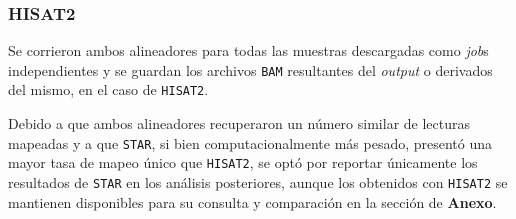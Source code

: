 \documentclass[
  12pt,
  letterpaper,
  DIV=11,
  numbers=noendperiod]{scrartcl}
\newenvironment{Shaded}{\begin{snugshade}}{\end{snugshade}}
\newcommand{\AttributeTok}[1]{\textcolor[rgb]{0.40,0.45,0.13}{#1}}
\newcommand{\CommentTok}[1]{\textcolor[rgb]{0.37,0.37,0.37}{#1}}
\newcommand{\DataTypeTok}[1]{\textcolor[rgb]{0.68,0.00,0.00}{#1}}
\newcommand{\DecValTok}[1]{\textcolor[rgb]{0.68,0.00,0.00}{#1}}
\newcommand{\ExtensionTok}[1]{\textcolor[rgb]{0.00,0.23,0.31}{#1}}
\newcommand{\NormalTok}[1]{\textcolor[rgb]{0.00,0.23,0.31}{#1}}
\newcommand{\OperatorTok}[1]{\textcolor[rgb]{0.37,0.37,0.37}{#1}}
\newcommand{\StringTok}[1]{\textcolor[rgb]{0.13,0.47,0.30}{#1}}
\newcommand{\VariableTok}[1]{\textcolor[rgb]{0.07,0.07,0.07}{#1}}
\begin{document}
\begin{Shaded}
\end{Shaded}

\subsubsection{HISAT2}\label{hisat2}

Se corrieron ambos alineadores para todas las muestras descargadas como
\emph{job}s independientes y se guardan los archivos \texttt{BAM}
resultantes del \emph{output} o derivados del mismo, en el caso de
\texttt{HISAT2}.

Debido a que ambos alineadores recuperaron un número similar de lecturas
mapeadas y a que \texttt{STAR}, si bien computacionalmente más pesado,
presentó una mayor tasa de mapeo único que \texttt{HISAT2}, se optó por
reportar únicamente los resultados de \texttt{STAR} en los análisis
posteriores, aunque los obtenidos con \texttt{HISAT2} se mantienen
disponibles para su consulta y comparación en la sección de
\textbf{Anexo}.
\end{document}
